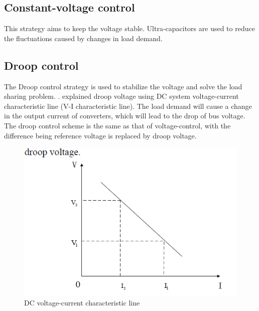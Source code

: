 \subsection{Constant-voltage control} 
This strategy aims to keep the voltage stable. Ultra-capacitors are used to reduce the fluctuations caused by changes in load demand.\par
\subsection{Droop control} 
The Droop control strategy is used to stabilize the voltage and solve the load sharing problem. \cite{22}. \cite{23} explained droop voltage using DC system voltage-current characteristic line (V-I characteristic line). The load demand will cause a change in the output current of converters, which will lead to the drop of bus voltage. The droop control scheme is the same as that of voltage-control, with the difference being reference voltage is replaced by droop voltage.\par
\begin{figure}[H]
	\centering
	\includegraphics[totalheight=6cm]{Figures/dc voltage characteristics.png}
	\caption{DC voltage-current characteristic line}
\end{figure}
